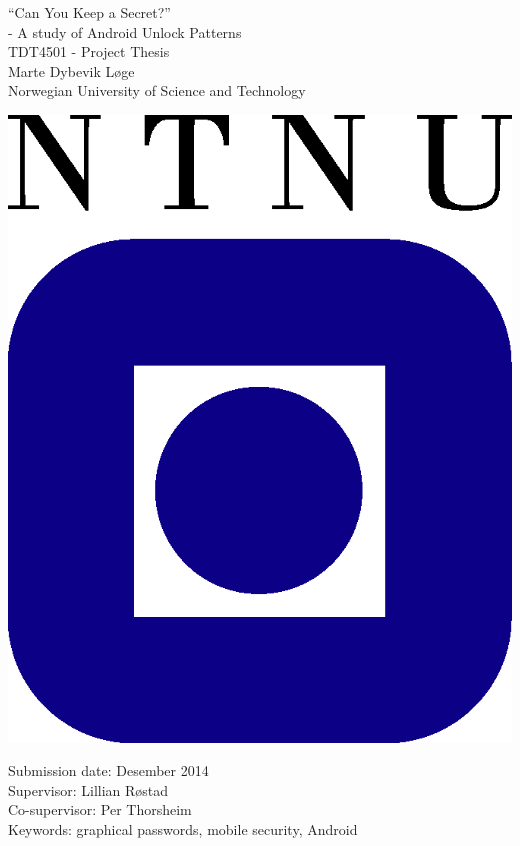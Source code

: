 \begin{titlepage}
\begin{center}

	{\Huge ``Can You Keep a Secret?''\\ [0.4cm]
	- A study of Android Unlock Patterns} \\[1.5cm]


	{\Large TDT4501 - Project Thesis} \\[2.0cm]
	{\Large Marte Dybevik Løge} \\ [0.5cm]
	{\Large Norwegian University of Science and Technology}\\

	\vspace{3.0cm}

			\includegraphics{pics/ntnu-logo2.png}

	\vspace{3.0cm}

	{\Large Submission date: Desember 2014} \\[0.2cm]
	{\Large Supervisor: Lillian Røstad} \\ [0.2cm]
	{\Large Co-supervisor: Per Thorsheim} \\ [0.2cm]
	{\Large Keywords: graphical passwords, mobile security, Android}


\end{center}
\end{titlepage}